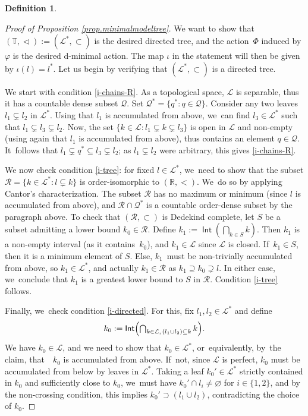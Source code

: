 \documentclass[JEP,XML,SOM,Unicode,NoFloatCountersInSection,published]{cedram}
\theoremstyle{definition}
\newtheorem{dfn}[thm]{Definition}
\DeclareMathOperator{\Int}{\mathsf{Int}}
\newcommand{\R}{\mathbb{R}}
\newcommand{\Tbb}{\mathbb T}
\newcommand{\Lcal}{\mathcal{L}}
\newcommand{\treeorder}{\mathrel{\triangleleft}}
\begin{document}
\begin{dfn}
\begin{proof}[Proof of Proposition \ref{prop.minimalmodeltree}]
We want to show that $(\Tbb, \treeorder):=(\Lcal^*,\subset)$ is the desired directed tree, and the action~$\Phi $ induced by $\varphi$ is the desired d-minimal action. The map $\iota$ in the statement will then be given by $\iota(l)=l^\ast$. Let us begin by verifying that $(\Lcal^*,\subset)$ is a directed tree.

We start with condition \eqref{i-chains-R}. As a topological space, $\Lcal$ is separable, thus it has a countable dense subset $\mathcal{Q}$. Set $\mathcal{Q}^\ast=\{q^\ast : q\in \mathcal{Q}\}$. Consider any two leaves $l_1\subsetneq l_2$ in $\Lcal^\ast$. Using that $l_1$ is accumulated from above, we~can find $l_3\in \Lcal^\ast$ such that $l_1\subsetneq l_3\subsetneq l_2$. Now, the set $\{k\in \Lcal: l_1 \subsetneq k\subsetneq l_3\}$ is open in $\Lcal$ and non-empty (using again that $l_1$ is accumulated from above), thus contains an element $q\in \mathcal{Q}$. It~follows that $l_1 \subsetneq q^\ast \subseteq l_3\subsetneq l_2$; as $l_1\subsetneq l_2$ were arbitrary, this gives \eqref{i-chains-R}.

We now check condition \eqref{i-tree}: for fixed $l\in \Lcal^*$, we~need to show that the subset $\mathcal R=\{k\in \Lcal^*:l\subsetneq k\}$ is order-isomorphic to $(\R, <)$. We~do so by applying Cantor's characterization. The subset $\mathcal R$ has no maximum or minimum (since $l$ is accumulated from above), and $\mathcal R\cap \mathcal{Q}^\ast$ is a countable order-dense subset by the paragraph above. To check that $(\mathcal R, \subset)$ is Dedekind complete, let $S$ be a subset admitting a lower bound $k_0\in \mathcal R$. Define $k_1:=\Int\left (\bigcap_{k\in S}k\right)$. Then $k_1$ is a non-empty interval (as it contains~$k_0$), and $k_1\in\Lcal$ since $\Lcal$ is closed. If~$k_1\in S$, then it is a minimum element of $S$. Else, $k_1$~must be non-trivially accumulated from above, so $k_1\in \Lcal^\ast$, and actually $k_1\in \mathcal R$ as $k_1\supseteq k_0\supsetneq l$. In either case, we~conclude that $k_1$ is a greatest lower bound to $S$ in $\mathcal R$. Condition \eqref{i-tree} follows.

Finally, we~check condition \eqref{i-directed}. For this, fix $l_1,l_2\in \Lcal^*$ and define\vspace*{-3pt}
\[\textstyle k_0:=\Int\Bigl (\bigcap_{k\in\Lcal,\,(l_1\cup l_2)\subseteq k }k \Bigr).
\]
We have $k_0\in \Lcal$, and we need to show that $k_0\in \Lcal^*$, or~equivalently, by~the claim, that~ $k_0$ is accumulated from above. If~not, since $\Lcal$ is perfect, $k_0$ must be accumulated from below by leaves in $\Lcal^*$. Taking a leaf $k_0'\in \Lcal^*$ strictly contained in $k_0$ and sufficiently close to $k_0$, we~must have $k_0'\cap l_i\neq \varnothing$ for $i\in \{1,2\}$, and by the non-crossing condition, this implies $k_0'\supset (l_1\cup l_2)$, contradicting the choice of $k_0$.


\end{proof}
\end{dfn}
\end{document}
